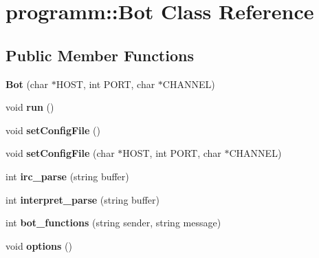 \hypertarget{classprogramm_1_1Bot}{\section{programm\-:\-:\-Bot \-Class \-Reference}
\label{classprogramm_1_1Bot}
}
\subsection*{\-Public \-Member \-Functions}
\begin{DoxyCompactItemize}
\item 
\hypertarget{classprogramm_1_1Bot_acd10624f6f1b985cfc1da5270f1a9f05}{{\bfseries \-Bot} (char $\ast$\-H\-O\-S\-T, int \-P\-O\-R\-T, char $\ast$\-C\-H\-A\-N\-N\-E\-L)}\label{classprogramm_1_1Bot_acd10624f6f1b985cfc1da5270f1a9f05}

\item 
\hypertarget{classprogramm_1_1Bot_ac323a0189bb0a3215fe44de6ef47f04d}{void {\bfseries run} ()}\label{classprogramm_1_1Bot_ac323a0189bb0a3215fe44de6ef47f04d}

\item 
\hypertarget{classprogramm_1_1Bot_a25fb8d0b31aa845f22d12e8cfd1fbd26}{void {\bfseries set\-Config\-File} ()}\label{classprogramm_1_1Bot_a25fb8d0b31aa845f22d12e8cfd1fbd26}

\item 
\hypertarget{classprogramm_1_1Bot_a462382e92191b9d4c208b2cc88def088}{void {\bfseries set\-Config\-File} (char $\ast$\-H\-O\-S\-T, int \-P\-O\-R\-T, char $\ast$\-C\-H\-A\-N\-N\-E\-L)}\label{classprogramm_1_1Bot_a462382e92191b9d4c208b2cc88def088}

\item 
\hypertarget{classprogramm_1_1Bot_ad87b537176180040cd769a559d576744}{int {\bfseries irc\-\_\-parse} (string buffer)}\label{classprogramm_1_1Bot_ad87b537176180040cd769a559d576744}

\item 
\hypertarget{classprogramm_1_1Bot_ae41616ccd9c4efc30a0d6e76489f759a}{int {\bfseries interpret\-\_\-parse} (string buffer)}\label{classprogramm_1_1Bot_ae41616ccd9c4efc30a0d6e76489f759a}

\item 
\hypertarget{classprogramm_1_1Bot_ac86565a07734e6ac04d38b80a17870ad}{int {\bfseries bot\-\_\-functions} (string sender, string message)}\label{classprogramm_1_1Bot_ac86565a07734e6ac04d38b80a17870ad}

\item 
\hypertarget{classprogramm_1_1Bot_a6f7ed62a41324e34c93f700ce4c996ab}{void {\bfseries options} ()}\label{classprogramm_1_1Bot_a6f7ed62a41324e34c93f700ce4c996ab}


\end{DoxyCompactItemize}
